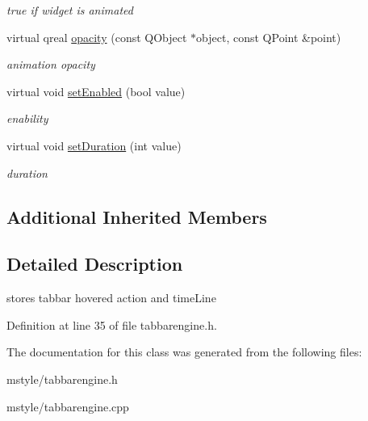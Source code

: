 \begin{DoxyCompactItemize}
\begin{DoxyCompactList}\small\item\em true if widget is animated \end{DoxyCompactList}\item 
\mbox{\label{class_tab_bar_engine_aaca3e36cf062bdff49a39a50172087a4}} 
virtual qreal \hyperlink{class_tab_bar_engine_aaca3e36cf062bdff49a39a50172087a4}{opacity} (const Q\+Object $\ast$object, const Q\+Point \&point)
\begin{DoxyCompactList}\small\item\em animation opacity \end{DoxyCompactList}\item 
\mbox{\label{class_tab_bar_engine_a5083b06caf8c9ac1e86709e86d99c5f1}} 
virtual void \hyperlink{class_tab_bar_engine_a5083b06caf8c9ac1e86709e86d99c5f1}{set\+Enabled} (bool value)
\begin{DoxyCompactList}\small\item\em enability \end{DoxyCompactList}\item 
\mbox{\label{class_tab_bar_engine_a31c21f400f1d6a06d97c729220c5b213}} 
virtual void \hyperlink{class_tab_bar_engine_a31c21f400f1d6a06d97c729220c5b213}{set\+Duration} (int value)
\begin{DoxyCompactList}\small\item\em duration \end{DoxyCompactList}\end{DoxyCompactItemize}
\subsection*{Additional Inherited Members}


\subsection{Detailed Description}
stores tabbar hovered action and time\+Line 

Definition at line 35 of file tabbarengine.\+h.



The documentation for this class was generated from the following files\+:\begin{DoxyCompactItemize}
\item 
mstyle/tabbarengine.\+h\item 
mstyle/tabbarengine.\+cpp\end{DoxyCompactItemize}
